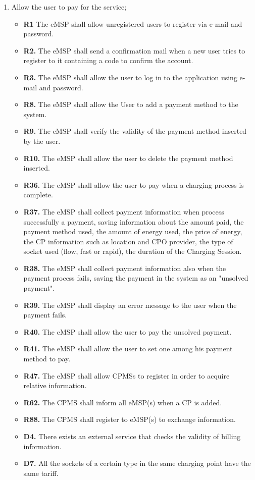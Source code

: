 \documentclass{Configuration_Files/PoliMi3i_thesis}
\begin{document}
\begin{enumerate}[label=\textbf{G\arabic*}]
    \item Allow the user to pay for the service;
        \begin{itemize}
            \item \textbf{R1} The eMSP shall allow unregistered users to register via e-mail and password.
            \item \textbf{R2.} The eMSP shall send a confirmation mail when a new user tries to register to it containing a code to confirm the account.
            \item \textbf{R3.} The eMSP shall allow the user to log in to the application using e-mail and password. 
            \item \textbf{R8.} The eMSP shall allow the User to add a payment method to the system.
            \item \textbf{R9.} The eMSP shall verify the validity of the payment method inserted by the user.
            \item \textbf{R10.} The eMSP shall allow the user to delete the payment method inserted.
            \item \textbf{R36.} The eMSP shall allow the user to pay when a charging process is complete.
            \item \textbf{R37.} The eMSP shall collect payment information when process successfully a payment, saving information about the amount paid, the payment method used, the amount of energy used, the price of energy,  the CP information such as location and CPO provider, the type of socket used (flow, fast or rapid), the duration of the Charging Session.
            \item \textbf{R38.} The eMSP shall collect payment information also when the payment process fails, saving the payment in the system as an "unsolved payment".
            \item \textbf{R39.} The eMSP shall display an error message to the user when the payment fails.
            \item \textbf{R40.} The eMSP shall allow the user to pay the unsolved payment.
            \item \textbf{R41.} The eMSP shall allow the user to set one among his payment method to pay.
            \item \textbf{R47.} The eMSP shall allow CPMSs to register in order to acquire relative information.
            \item \textbf{R62.} The CPMS shall inform all eMSP(s) when a CP is added.
            \item \textbf{R88.} The CPMS shall register to eMSP(s) to exchange information.
            \item \textbf{D4.} There exists an external service that checks the validity of billing information.
            \item \textbf{D7.} All the sockets of a certain type in the same charging point have the same tariff.
        \end{itemize}


\end{enumerate}
\end{document}
